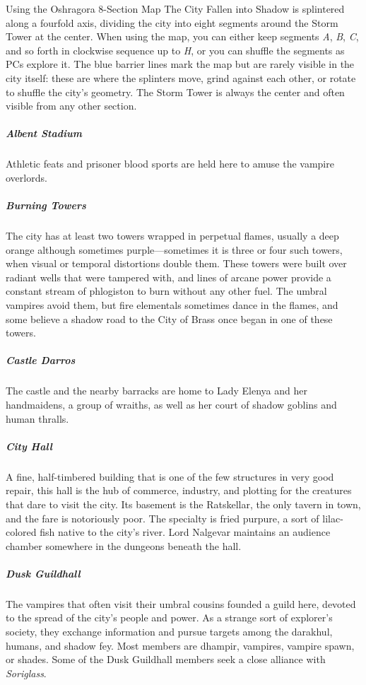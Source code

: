\documentclass[10pt,a4paper,twoside,bg=print,twocolumn,openany,nodeprecatedcode]{dndbook}
\begin{document}
\begin{DndSidebar}[float=!b]{Using the Oshragora 8-Section Map}
The City Fallen into Shadow is splintered along a fourfold axis, dividing the city into eight segments around the Storm Tower at the center. When using the map, you can either keep segments \textit{A}, \textit{B}, \textit{C}, and so forth in clockwise sequence up to \textit{H}, or you can shuffle the segments as PCs explore it. The blue barrier lines mark the map but are rarely visible in the city itself: these are where the splinters move, grind against each other, or rotate to shuffle the city's geometry. The Storm Tower is always the center and often visible from any other section.



\end{DndSidebar}

\subparagraph{Albent Stadium}
Athletic feats and prisoner blood sports are held here to amuse the vampire overlords.

\subparagraph{Burning Towers}
The city has at least two towers wrapped in perpetual flames, usually a deep orange although sometimes purple—sometimes it is three or four such towers, when visual or temporal distortions double them. These towers were built over radiant wells that were tampered with, and lines of arcane power provide a constant stream of phlogiston to burn without any other fuel. The umbral vampires avoid them, but fire elementals sometimes dance in the flames, and some believe a shadow road to the City of Brass once began in one of these towers.

\subparagraph{Castle Darros}
The castle and the nearby barracks are home to Lady Elenya and her handmaidens, a group of wraiths, as well as her court of shadow goblins and human thralls.

\subparagraph{City Hall}
A fine, half-timbered building that is one of the few structures in very good repair, this hall is the hub of commerce, industry, and plotting for the creatures that dare to visit the city. Its basement is the Ratskellar, the only tavern in town, and the fare is notoriously poor. The specialty is fried purpure, a sort of lilac-colored fish native to the city's river. Lord Nalgevar maintains an audience chamber somewhere in the dungeons beneath the hall.

\subparagraph{Dusk Guildhall}
The vampires that often visit their umbral cousins founded a guild here, devoted to the spread of the city's people and power. As a strange sort of explorer's society, they exchange information and pursue targets among the darakhul, humans, and shadow fey. Most members are dhampir, vampires, vampire spawn, or shades. Some of the Dusk Guildhall members seek a close alliance with \textit{Soriglass}.
\end{document}
